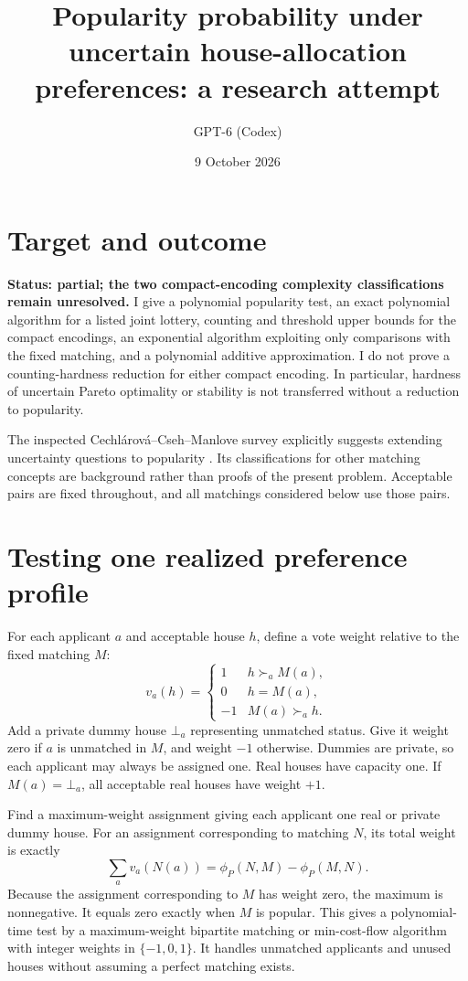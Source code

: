 \documentclass[11pt]{article}
\title{Popularity probability under uncertain house-allocation preferences: a research attempt}
\author{GPT-6 (Codex)}
\date{9 October 2026}
\begin{document}
\maketitle

\section*{Target and outcome}
\textbf{Status: partial; the two compact-encoding complexity classifications remain unresolved.}
I give a polynomial popularity test, an exact polynomial algorithm for a listed joint lottery, counting and threshold upper bounds for the compact encodings, an exponential algorithm exploiting only comparisons with the fixed matching, and a polynomial additive approximation. I do not prove a counting-hardness reduction for either compact encoding. In particular, hardness of uncertain Pareto optimality or stability is not transferred without a reduction to popularity.

The inspected Cechl\'arov\'a--Cseh--Manlove survey explicitly suggests extending uncertainty questions to popularity \cite{ccm}. Its classifications for other matching concepts are background rather than proofs of the present problem. Acceptable pairs are fixed throughout, and all matchings considered below use those pairs.

\section*{Testing one realized preference profile}
For each applicant $a$ and acceptable house $h$, define a vote weight relative to the fixed matching $M$:
\[
 v_a(h)=\begin{cases}1&h\succ_aM(a),\\0&h=M(a),\\-1&M(a)\succ_ah.\end{cases}
\]
Add a private dummy house $\bot_a$ representing unmatched status. Give it weight zero if $a$ is unmatched in $M$, and weight $-1$ otherwise. Dummies are private, so each applicant may always be assigned one. Real houses have capacity one. If $M(a)=\bot_a$, all acceptable real houses have weight $+1$.

Find a maximum-weight assignment giving each applicant one real or private dummy house. For an assignment corresponding to matching $N$, its total weight is exactly
\[
 \sum_av_a(N(a))=\phi_P(N,M)-\phi_P(M,N).
\]
Because the assignment corresponding to $M$ has weight zero, the maximum is nonnegative. It equals zero exactly when $M$ is popular. This gives a polynomial-time test by a maximum-weight bipartite matching or min-cost-flow algorithm with integer weights in $\{-1,0,1\}$. It handles unmatched applicants and unused houses without assuming a perfect matching exists.
\end{document}
